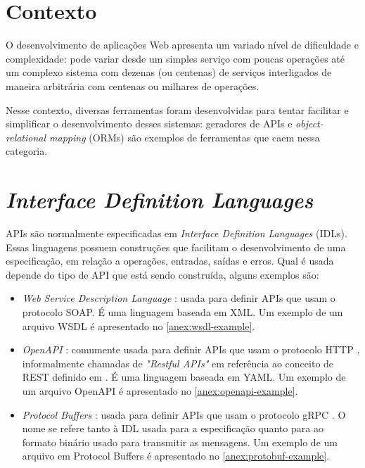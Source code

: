 \section{Contexto}

O desenvolvimento de aplicações Web apresenta um variado nível de dificuldade e
complexidade: pode variar desde um simples serviço com poucas operações até
um complexo sistema com dezenas (ou centenas) de serviços interligados de maneira
arbitrária com centenas ou milhares de operações.

Nesse contexto, diversas ferramentas foram desenvolvidas para tentar facilitar
e simplificar o desenvolvimento desses sistemas: geradores de APIs e \textit{object-relational
mapping} (ORMs) são exemplos de ferramentas que caem nessa categoria.

\section{\textit{Interface Definition Languages}}

APIs são normalmente especificadas em \textit{Interface Definition Languages}
(IDLs). Essas linguagens possuem construções que facilitam o desenvolvimento de uma
especificação, em relação a operações, entradas, saídas e erros. Qual é usada
depende do tipo de API que está sendo construída, alguns exemplos são:

\begin{itemize}
\item
  \textit{Web Service Description Language} \cite{wsdl:spec}: usada para
    definir APIs que usam o protocolo SOAP. É uma linguagem baseada em XML.
    Um exemplo de um arquivo WSDL é apresentado no \cref{anex:wsdl-example}.
\item
  \textit{OpenAPI} \cite{openapi:spec}: comumente usada para definir APIs que usam
    o protocolo HTTP \cite{rfc2616}, informalmente chamadas de \textit{"Restful APIs"}
    em referência ao conceito de REST definido em \cite{10.5555/932295}. É uma linguagem
    baseada em YAML. Um exemplo de um arquivo OpenAPI é apresentado no \cref{anex:openapi-example}.
\item
  \textit{Protocol Buffers} \cite{googl:protobuf}: usada para definir APIs que usam
    o protocolo gRPC \cite{googl:grpc}. O nome se refere tanto à IDL usada para a
    especificação quanto para ao formato binário usado para transmitir as mensagens.
    Um exemplo de um arquivo em Protocol Buffers é apresentado no \cref{anex:protobuf-example}.
\end{itemize}

